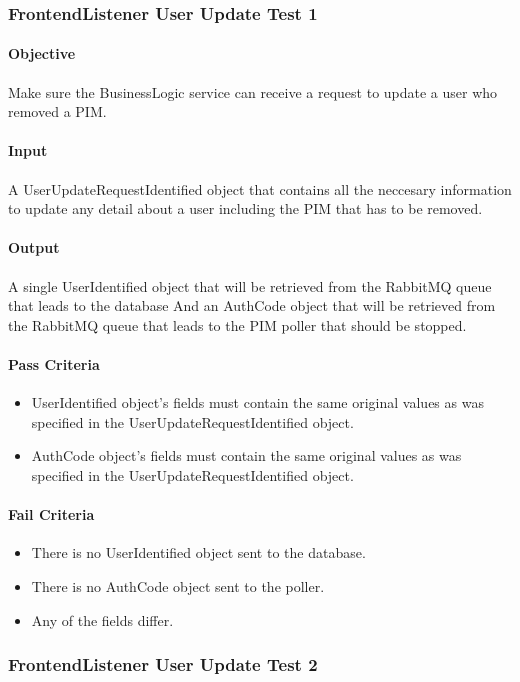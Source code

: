 \documentclass[hidelinks,english]{article}
\begin{document}
			\subsubsection{FrontendListener User Update Test 1}\label{businessfrontendlistenerupdatetest1}
				\paragraph{Objective} Make sure the BusinessLogic service can receive a request to update a user who removed a PIM.
				\paragraph{Input} A UserUpdateRequestIdentified object that contains all the neccesary information to update any detail about a user including the PIM that has to be removed.
				\paragraph{Output} A single UserIdentified object that will be retrieved from the RabbitMQ queue that leads to the database And an AuthCode object that  will be retrieved from the RabbitMQ queue that leads to the PIM poller that should be stopped.
				\paragraph{Pass Criteria}
				\begin{itemize}
					\item UserIdentified object's fields must contain the same original values as was specified in the UserUpdateRequestIdentified object.
					\item AuthCode object's fields must contain the same original values as was specified in the UserUpdateRequestIdentified object.
				\end{itemize}
				\paragraph{Fail Criteria}
				\begin{itemize}
					\item There is no UserIdentified object sent to the database.
					\item There is no AuthCode object sent to the poller.
					\item Any of the fields differ.
				\end{itemize}
			
			\subsubsection{FrontendListener User Update Test 2}\label{businessfrontendlistenerupdatetest2}
\end{document}
